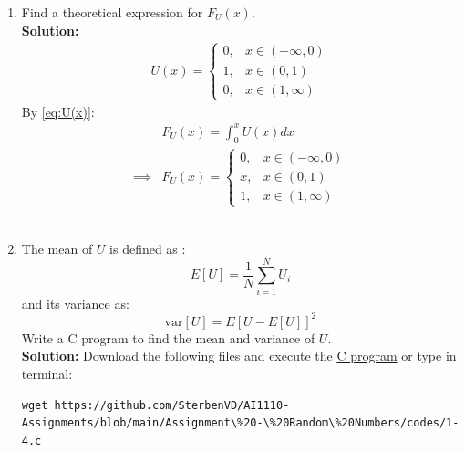 \documentclass[journal,12pt,twocolumn]{IEEEtran}
\numberwithin{equation}{section}
\renewcommand\thesection{\arabic{section}}
\providecommand{\sbrak}[1]{\ensuremath{{}\left[#1\right]}}
\providecommand{\gitlink}[2]{{\color{blue}\href{https://github.com/SterbenVD/AI1110-Assignments/blob/main/Assignment\%20-\%20Random\%20Numbers/#1}{#2}}}
\newcommand{\solution}{\noindent \textbf{\\ Solution: }}
\begin{document}
\begin{enumerate}[label=\thesection.\arabic*,ref=\thesection.\theenumi]
\begin{figure}[H]
          \end{figure}
          \solution  The following \gitlink{codes/1-2.py}{python code} plots Fig. \ref{fig:1_cdf} or type in terminal:
          \begin{lstlisting}
wget https://github.com/SterbenVD/AI1110-Assignments/blob/main/Assignment\%20-\%20Random\%20Numbers/codes/1-2.py
            \end{lstlisting}
    \item Find a  theoretical expression for $F_{U}(x)$.
          \solution
          \begin{align}
              \label{eq:U(x)}
              U(x) =
              \begin{cases}
                  0, & x \in (-\infty,0) \\
                  1, & x \in (0,1)       \\
                  0, & x \in (1, \infty)
              \end{cases}
          \end{align}
          By \eqref{eq:U(x)}:
          \begin{align}
                       & F_U(x) = \int_0^x U(x) dx \\
              \implies & F_U(x) =
              \begin{cases}
                  0, & x \in (-\infty,0) \\
                  x, & x \in (0,1)       \\
                  1, & x \in (1, \infty)
              \end{cases}
          \end{align}
          \\
    \item
          The mean of $U$ is defined as :
          \begin{equation}
              E\sbrak{U} = \dfrac{1}{N}\sum_{i=1}^{N}U_i
          \end{equation}
          and its variance as:
          \begin{equation}
              \text{var}\sbrak{U} = E\sbrak{U- E\sbrak{U}}^2
          \end{equation}
          Write a C program to  find the mean and variance of $U$.
          \solution Download the following files and execute the \gitlink{codes/1-4.c}{C program} or type in terminal:
          \begin{lstlisting}
wget https://github.com/SterbenVD/AI1110-Assignments/blob/main/Assignment\%20-\%20Random\%20Numbers/codes/1-4.c

\end{lstlisting}
\end{enumerate}
\end{document}
